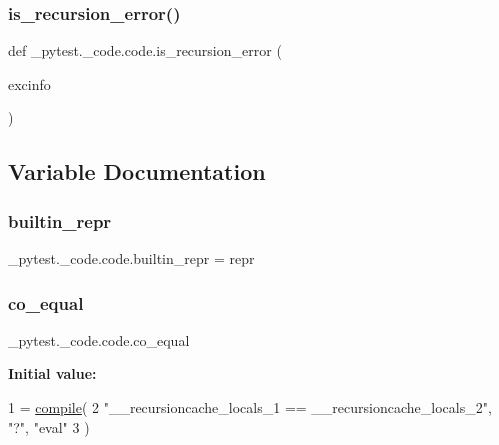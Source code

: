 \subsubsection{\texorpdfstring{is\+\_\+recursion\+\_\+error()}{is\_recursion\_error()}}
{\footnotesize\ttfamily def \+\_\+pytest.\+\_\+code.\+code.\+is\+\_\+recursion\+\_\+error (\begin{DoxyParamCaption}\item[{}]{excinfo }\end{DoxyParamCaption})}



\subsection{Variable Documentation}
\mbox{\label{namespace__pytest_1_1__code_1_1code_a2e7c6c7b34f9427778cd1fb764c077e7}} 
\subsubsection{\texorpdfstring{builtin\+\_\+repr}{builtin\_repr}}
{\footnotesize\ttfamily \+\_\+pytest.\+\_\+code.\+code.\+builtin\+\_\+repr = repr}

\mbox{\label{namespace__pytest_1_1__code_1_1code_a75b7707545f34e33c24d152a4e48e09f}} 
\subsubsection{\texorpdfstring{co\+\_\+equal}{co\_equal}}
{\footnotesize\ttfamily \+\_\+pytest.\+\_\+code.\+code.\+co\+\_\+equal}

{\bfseries Initial value\+:}
\begin{DoxyCode}
1 =  \hyperlink{namespacepygame_1_1cursors_a19f38a01d13e77f591209869d99d99e5}{compile}(
2     \textcolor{stringliteral}{"\_\_recursioncache\_locals\_1 == \_\_recursioncache\_locals\_2"}, \textcolor{stringliteral}{"?"}, \textcolor{stringliteral}{"eval"}
3 )
\end{DoxyCode}
